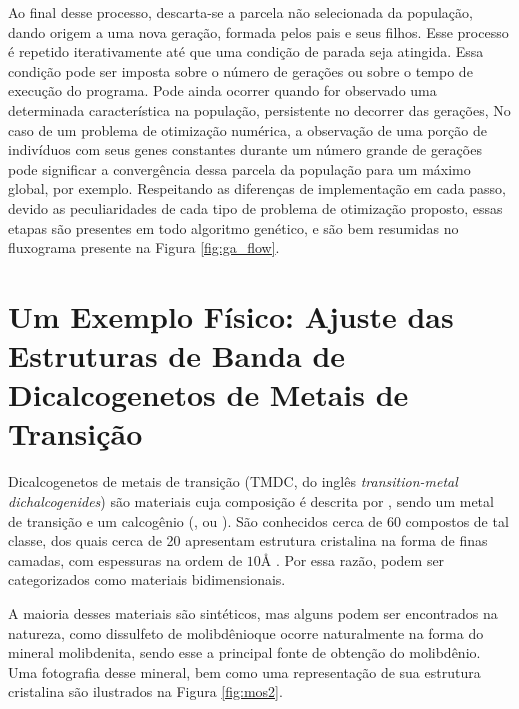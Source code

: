 Ao final desse processo, descarta-se a parcela não selecionada da população, dando origem a uma nova geração, formada
pelos pais e seus filhos. Esse processo é repetido iterativamente até que uma condição de parada seja
atingida. Essa condição pode ser imposta sobre o número de gerações ou sobre o tempo de execução do programa.
Pode ainda ocorrer quando for observado uma determinada característica na população, persistente no decorrer das gerações,
No caso de um problema de otimização numérica, a observação de uma porção de indivíduos com seus genes
constantes durante um número grande de gerações pode significar a convergência dessa parcela da população
para um máximo global, por exemplo.
Respeitando as diferenças de implementação em cada passo, devido as peculiaridades de cada tipo de problema
de otimização proposto, essas etapas são presentes em todo algoritmo genético, e são bem resumidas no fluxograma
presente na Figura \ref{fig:ga_flow}.



\section{Um Exemplo Físico: Ajuste das Estruturas de Banda de Dicalcogenetos de Metais de Transição}
\label{sec_tmdcs_intro}

Dicalcogenetos de metais de transição (TMDC, do inglês 
\textit{transition-metal dichalcogenides}) são materiais cuja composição é
descrita por , sendo  um metal de transição e  um calcogênio
(,  ou ). São conhecidos cerca de 60 compostos de tal classe,
dos quais cerca de 20 apresentam estrutura cristalina na forma de finas camadas, com
espessuras na ordem de $10\si{\angstrom}$ \cite{kolobov2016tmdc}. Por essa razão, 
podem ser categorizados como materiais bidimensionais.

A maioria desses materiais são sintéticos, mas alguns podem ser encontrados na natureza,
como \trav dissulfeto de molibdênio\trav que ocorre naturalmente na
forma do mineral molibdenita, sendo esse a principal fonte de obtenção do molibdênio.
Uma fotografia desse mineral, bem como uma representação de sua estrutura cristalina
são ilustrados na Figura \ref{fig:mos2}.

